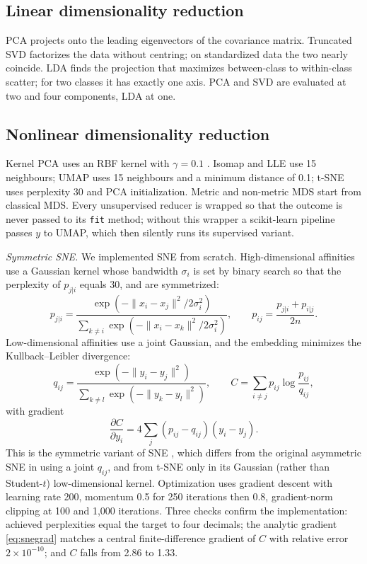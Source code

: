 \documentclass[conference]{IEEEtran}
\begin{document}
\subsection{Linear dimensionality reduction}
PCA projects onto the leading eigenvectors of the covariance matrix. Truncated SVD factorizes the data without centring; on standardized data the two nearly coincide. LDA finds the projection that maximizes between-class to within-class scatter; for two classes it has exactly one axis. PCA and SVD are evaluated at two and four components, LDA at one.

\subsection{Nonlinear dimensionality reduction}
Kernel PCA uses an RBF kernel with $\gamma=0.1$ \cite{scholkopf1998}. Isomap \cite{tenenbaum2000} and LLE \cite{roweis2000} use 15 neighbours; UMAP \cite{mcinnes2018} uses 15 neighbours and a minimum distance of 0.1; t-SNE \cite{vandermaaten2008} uses perplexity 30 and PCA initialization. Metric and non-metric MDS \cite{kruskal1964} start from classical MDS. Every unsupervised reducer is wrapped so that the outcome is never passed to its \texttt{fit} method; without this wrapper a scikit-learn pipeline passes $y$ to UMAP, which then silently runs its supervised variant.

\textit{Symmetric SNE.} We implemented SNE from scratch. High-dimensional affinities use a Gaussian kernel whose bandwidth $\sigma_i$ is set by binary search so that the perplexity of $p_{j|i}$ equals 30, and are symmetrized:
\begin{equation}
p_{j|i}=\frac{\exp(-\lVert x_i-x_j\rVert^2/2\sigma_i^2)}{\sum_{k\neq i}\exp(-\lVert x_i-x_k\rVert^2/2\sigma_i^2)},\qquad p_{ij}=\frac{p_{j|i}+p_{i|j}}{2n}.
\end{equation}
Low-dimensional affinities use a joint Gaussian, and the embedding minimizes the Kullback--Leibler divergence:
\begin{equation}
q_{ij}=\frac{\exp(-\lVert y_i-y_j\rVert^2)}{\sum_{k\neq l}\exp(-\lVert y_k-y_l\rVert^2)},\qquad C=\sum_{i\neq j}p_{ij}\log\frac{p_{ij}}{q_{ij}},
\end{equation}
with gradient
\begin{equation}
\frac{\partial C}{\partial y_i}=4\sum_{j}(p_{ij}-q_{ij})(y_i-y_j).
\label{eq:snegrad}
\end{equation}
This is the symmetric variant of SNE \cite{vandermaaten2008}, which differs from the original asymmetric SNE \cite{hinton2002} in using a joint $q_{ij}$, and from t-SNE only in its Gaussian (rather than Student-$t$) low-dimensional kernel. Optimization uses gradient descent with learning rate 200, momentum 0.5 for 250 iterations then 0.8, gradient-norm clipping at 100 and 1,000 iterations. Three checks confirm the implementation: achieved perplexities equal the target to four decimals; the analytic gradient \eqref{eq:snegrad} matches a central finite-difference gradient of $C$ with relative error $2\times10^{-10}$; and $C$ falls from 2.86 to 1.33.
\end{document}
